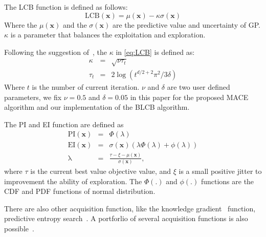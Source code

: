 The LCB function is defined as follows:
\begin{equation}
    \label{eq:LCB}
    \mathrm{LCB}(\bm{x}) = \mu(\bm{x}) - \kappa \sigma(\bm{x})
\end{equation}
Where the $\mu(\bm{x})$ and the $\sigma(\bm{x})$ are the predictive value and uncertainty of GP. $\kappa$ is a parameter that balances the exploitation and exploration. 

Following the suggestion of~\cite{brochu2010tutorial}, the $\kappa$ in \eqref{eq:LCB} is defined as:
\begin{equation}
    \label{eq:LCB}
    \begin{array}{lll}
        \kappa &=& \sqrt{\nu \tau_t} \\
        \tau_t &=& 2 \log(t^{d/2+2} \pi^2 / 3 \delta)
    \end{array}
\end{equation}
Where $t$ is the number of current iteration. $\nu$ and $\delta$ are two user defined parameters, we fix $\nu = 0.5$ and $\delta = 0.05$ in this paper for the proposed MACE algorithm and our implementation of the BLCB algorithm.

The PI and EI function are defined as
\begin{equation}
    \label{eq:PI_EI}
    \begin{array}{lll}
        \mathrm{PI}(\bm{x}) &=& \Phi(\lambda) \\
        \mathrm{EI}(\bm{x}) &=& \sigma(\bm{x}) (\lambda \Phi(\lambda) + \phi(\lambda))     \\
        \mathrm{\lambda}    &=& \displaystyle \frac{\tau - \xi - \mu(\bm{x})}{\sigma(\bm{x})}, 
    \end{array}
\end{equation}
where $\tau$ is the current best value objective value, and $\xi$ is a small positive jitter to improvement the ability of exploration. The $\Phi(.)$ and $\phi(.)$ functions are the CDF and PDF functions of normal distribution.


There are also other acquisition function, like the knowledge gradient~\cite{scott2011correlated} function, predictive entropy search~\cite{hernandez2014predictive}. A portforlio of several acquisition functions is also possible~\cite{hoffman2011portfolio}.
